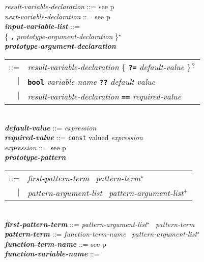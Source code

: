 \documentclass[12pt]{article}
\newcommand{\TT}[1]{{\tt \bfseries #1}}
\newcommand{\STAR}{{\Large $^\star$}}
\newcommand{\PLUS}[1][]{{$^{+#1}$}}
\newcommand{\QMARK}{{$^{\,\mbox{\footnotesize ?}}$}}
\newcommand{\emkey}[1]{{\em \bfseries #1}}
\newcommand{\pagref}[1]{p\pageref{#1}}
\newenvironment{indpar}[1][0.3in]%
	{\begin{list}{}%
		     {\setlength{\itemsep}{0in}%
		      \setlength{\topsep}{0in}%
		      \setlength{\parsep}{1ex}%
		      \setlength{\labelwidth}{#1}%
		      \setlength{\leftmargin}{#1}%
		      \addtolength{\leftmargin}{\labelsep}}%
	 \item}%
	{\end{list}}
\begin{document}
\begin{indpar}[0.1in]
{\em result-variable-declaration} ::= see \pagref{RESULT-VARIABLE-DECLARATION}
\\[0.5ex]
{\em next-variable-declaration} ::= see \pagref{NEXT-VARIABLE-DECLARATION}
\\[0.5ex]
\emkey{input-variable-list} ::= \\
\hspace*{0.5in}{\em prototype-argument-declaration}
                 \{ \TT{,} {\em prototype-argument-declaration} \}\STAR{}
\\[0.5ex]
\emkey{prototype-argument-declaration}\label{PROTOTYPE-ARGUMENT-DECLARATION} \\
\hspace*{0.5in}\begin{tabular}[t]{@{}rl@{}}
    ::= & {\em result-variable-declaration}
          \{ \TT{?=} {\em default-value} \}\QMARK{} \\
    $|$ & \TT{bool} {\em variable-name}
          \TT{??} {\em default-value} \\
    $|$ & {\em result-variable-declaration}
          \TT{==} {\em required-value} \\
    \end{tabular}
\\[0.5ex]
\emkey{default-value} ::= {\em expression}
\\[0.5ex]
\emkey{required-value} ::= {\tt const} valued {\em expression}
\\[0.5ex]
{\em expression} ::= see \pagref{EXPRESSION}
\\[0.5ex]
\emkey{prototype-pattern}\label{PROTOTYPE-PATTERN}
    \begin{tabular}[t]{rl}
    ::= & {\em first-pattern-term}~ {\em pattern-term}\STAR{} \\
    $|$ & {\em pattern-argument-list}~ {\em pattern-argument-list}\PLUS{}
    \end{tabular}
\\[0.5ex]
\emkey{first-pattern-term} ::= {\em pattern-argument-list}\STAR{}~
				{\em pattern-term}
\\[0.5ex]
\emkey{pattern-term}\label{PATTERN-TERM}
    ::= {\em function-term-name}~ {\em pattern-argument-list}\STAR{}
\\[0.5ex]
\emkey{function-term-name} ::= see \pagref{FUNCTION-TERM-NAME}
\\[0.5ex]
\emkey{function-variable-name}\label{FUNCTION-VARIABLE-NAME} ::= \\
\hspace*{0.5in}
    \begin{tabular}[t]{@{}p{5in}@{}}

\end{tabular}
\end{indpar}
\end{document}
